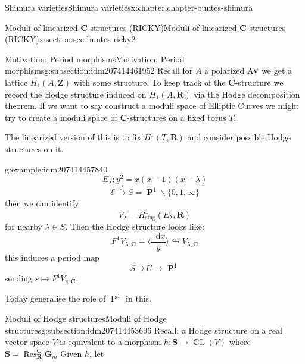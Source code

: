 \documentclass[oneside,10pt,]{book}
\numberwithin{equation}{section}
\newcommand{\diff}{\mathop{}\!\mathrm{d}}
\newcommand{\ZZ}{\mathbf{Z}}
\newcommand{\RR}{\mathbf{R}}
\newcommand{\CC}{\mathbf{C}}
\newcommand{\sing}{\mathrm{sing}}
\DeclareMathOperator{\Res}{Res}
\DeclareMathOperator{\PP}{\mathbf{P}}
\DeclareMathOperator{\GL}{GL}
\begin{document}
\begin{chapterptx}{Shimura varieties}{}{Shimura varieties}{}{}{x:chapter:chapter-buntes-shimura}
\begin{sectionptx}{Moduli of linearized \(\CC\)-structures (RICKY)}{}{Moduli of linearized \(\CC\)-structures (RICKY)}{}{}{x:section:sec-buntes-ricky2}
%
%
\typeout{************************************************}
\typeout{************************************************}
%
\begin{subsectionptx}{Motivation: Period morphisms}{}{Motivation: Period morphisms}{}{}{g:subsection:idm207414461952}
Recall for  \(A\) a  polarized AV we get a lattice \(H_1(A,\ZZ)\) with some structure. To keep track of the \(\CC\)-structure  we record the Hodge structure induced on \(H_1(A,\RR)\) via the Hodge decomposition theorem. If we want to say construct a moduli space of Elliptic Curves we might try to create a moduli space of \(\CC\)-structures on a fixed torus \(T\).%
\par
The linearized version of this is to fix \(H^1(T, \RR)\) and consider possible Hodge structures on it.%
\begin{example}{}{g:example:idm207414457840}%
%
\begin{equation*}
E_\lambda \colon y^2 = x(x-1) (x-\lambda)
\end{equation*}
%
\begin{equation*}
\mathcal E \xrightarrow f S = \PP^1 \smallsetminus \{0,1,\infty\}
\end{equation*}
then we can identify%
\begin{equation*}
V_\lambda = H^1_\sing(E_\lambda, \RR)
\end{equation*}
for nearby \(\lambda \in S\). Then the Hodge structure looks like:%
\begin{equation*}
F^1 V_{\lambda, \CC} = \langle \frac{\diff x}{y} \rangle \hookrightarrow V_{\lambda, \CC}
\end{equation*}
this induces a period map%
\begin{equation*}
S\supseteq U \to \PP^1
\end{equation*}
sending \(s \mapsto F^1V_{s, \CC}\).%
\end{example}
Today generalise the role of \(\PP^1\) in this.%
\end{subsectionptx}
%
%
\typeout{************************************************}
\typeout{************************************************}
%
\begin{subsectionptx}{Moduli of Hodge structures}{}{Moduli of Hodge structures}{}{}{g:subsection:idm207414453696}
Recall: a Hodge structure on a real vector space \(V\) is equivalent to a morphism \(h \colon \mathbf S \to \GL(V)\) where \(\mathbf S  = \Res_\RR^\CC \mathbf G_m\) Given \(h\), let%

\end{subsectionptx}
\end{sectionptx}
\end{chapterptx}
\end{document}
